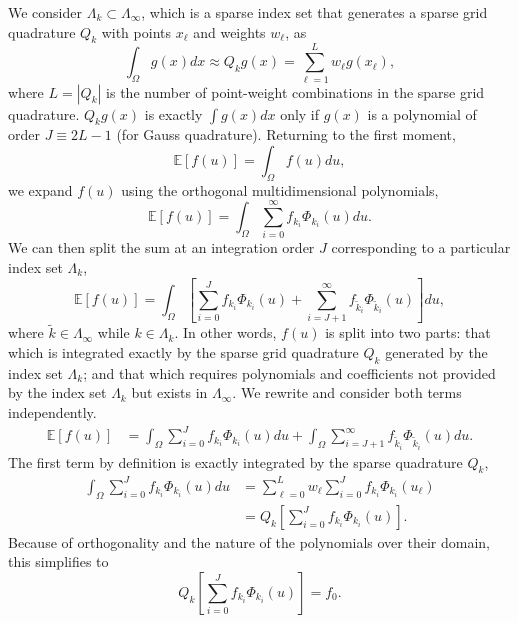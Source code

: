 \documentclass[11pt]{article}
\newcommand{\expv}[1]{\ensuremath{\mathbb{E}[ #1]}}
\begin{document}
We consider $\Lambda_k\subset\Lambda_\infty$, which is a sparse index set that generates a sparse grid quadrature $Q_k$ with points $x_\ell$ and weights $w_\ell$, as
\begin{equation}
\int_\Omega g(x)dx\approx Q_k g(x) = \sum_{\ell=1}^L w_\ell g(x_\ell),
\end{equation}
where $L=|Q_k|$ is the number of point-weight combinations in the sparse grid quadrature. $Q_k g(x)$ is exactly $\int g(x) dx$ only if $g(x)$ is a polynomial of order $J\equiv 2L-1$ (for Gauss quadrature).  Returning to the first moment,
\begin{equation}
\expv{f(u)} = \int_\Omega f(u)du,
\end{equation}
we expand $f(u)$ using the orthogonal multidimensional polynomials,
\begin{equation}
\expv{f(u)} = \int_\Omega \sum_{i=0}^\infty f_{k_i}\Phi_{k_i}(u) du.
\end{equation}
We can then split the sum at an integration order $J$ corresponding to a particular index set $\Lambda_k$,
\begin{equation}
\expv{f(u)} = \int_\Omega\left[ \sum_{i=0}^J f_{k_i}\Phi_{k_i}(u) + \sum_{i=J+1}^\infty f_{\tilde k_i}\Phi_{\tilde k_i}(u) \right]du,
\end{equation}
where $\tilde k\in\Lambda_\infty$ while $k\in\Lambda_k$.  In other words, $f(u)$ is split into two parts: that which is integrated exactly by the sparse grid quadrature $Q_k$ generated by the index set $\Lambda_k$; and that which requires polynomials and coefficients not provided by the index set $\Lambda_k$ but exists in $\Lambda_\infty$.  We rewrite and consider both terms independently.
\begin{align}
\expv{f(u)} &= \int_\Omega \sum_{i=0}^J f_{k_i}\Phi_{k_i}(u) du + \int_\Omega \sum_{i=J+1}^\infty f_{\tilde k_i}\Phi_{\tilde k_i}(u) du.
\end{align}
The first term by definition is exactly integrated by the sparse quadrature $Q_k$,
\begin{align}
\int_\Omega \sum_{i=0}^J f_{k_i}\Phi_{k_i}(u) du &= \sum_{\ell=0}^L w_\ell \sum_{i=0}^J f_{k_i}\Phi_{k_i}(u_\ell) \\
  &= Q_k\left[\sum_{i=0}^J f_{k_i}\Phi_{k_i}(u)\right].
\end{align}
Because of orthogonality and the nature of the polynomials over their domain, this simplifies to
\begin{equation}
Q_k\left[\sum_{i=0}^J f_{k_i}\Phi_{k_i}(u)\right] = f_0.
\end{equation}
\end{document}
